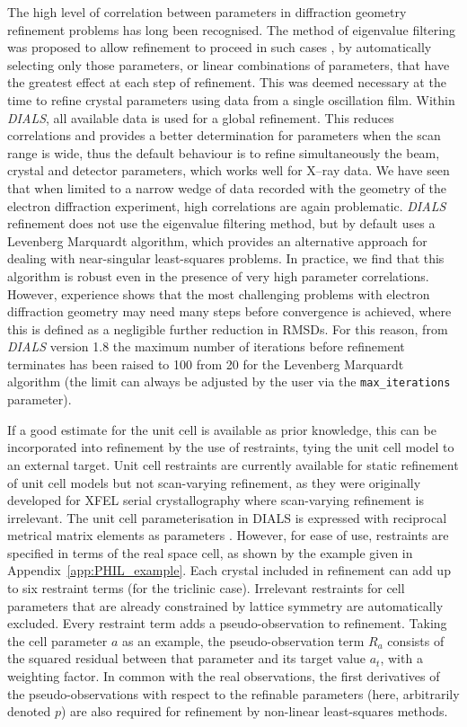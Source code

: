 \documentclass[preprint]{iucr}
\newcommand{\dials}{\emph{DIALS}\xspace}
\newcommand{\code}{\texttt}
\begin{document}
The high level of correlation between parameters in diffraction geometry
refinement problems has long been recognised. The method of eigenvalue
filtering was proposed to allow refinement to proceed in such cases
\cite{Reeke1984,LURE1986phase3}, by automatically selecting only those
parameters, or linear combinations of parameters, that have the greatest effect
at each step of refinement. This was deemed necessary at the time to refine
crystal parameters using data from a single oscillation film. Within \dials,
all available data is used for a global refinement. This reduces correlations
and provides a better determination for parameters when the scan range is wide,
thus the default behaviour is to refine simultaneously the beam, crystal and
detector parameters, which works well for X--ray data. We have seen that when
limited to a narrow wedge of data recorded with the geometry of the electron
diffraction experiment, high correlations are again problematic. \dials
refinement does not use the eigenvalue filtering method, but by default uses a
Levenberg Marquardt algorithm, which provides an alternative approach for
dealing with near-singular least-squares problems. In practice, we find that
this algorithm is robust even in the presence of very high parameter
correlations. However, experience shows that the most challenging problems with
electron diffraction geometry may need many steps before convergence is
achieved, where this is defined as a negligible further reduction in RMSDs. For
this reason, from \dials version 1.8 the maximum number of iterations before
refinement terminates has been raised to 100 from 20 for the Levenberg
Marquardt algorithm (the limit can always be adjusted by the user via the
\code{max\_iterations} parameter).

If a good estimate for the unit cell is available as prior knowledge, this can
be incorporated into refinement by the use of restraints, tying the unit cell
model to an external target. Unit cell restraints are currently available for
static refinement of unit cell models but not scan-varying refinement, as they
were originally developed for XFEL serial crystallography where scan-varying
refinement is irrelevant. The unit cell parameterisation in DIALS is expressed
with reciprocal metrical matrix elements as parameters \cite{Waterman2016}.
However, for ease of use, restraints are specified in terms of the real space
cell, as shown by the example given in Appendix~\ref{app:PHIL_example}. Each
crystal included in refinement can add up to six restraint terms (for the
triclinic case). Irrelevant restraints for cell parameters that are already
constrained by lattice symmetry are automatically excluded. Every restraint
term adds a pseudo-observation to refinement. Taking the cell parameter $a$ as
an example, the pseudo-observation term $R_a$ consists of the squared residual
between that parameter and its target value $a_t$, with a weighting factor. In
common with the real observations, the first derivatives of the
pseudo-observations with respect to the refinable parameters (here, arbitrarily
denoted $p$) are also required for refinement by non-linear least-squares
methods.
\end{document}

